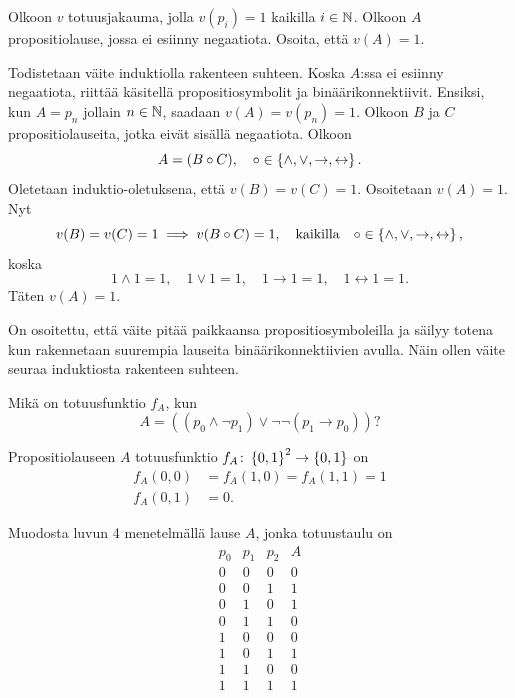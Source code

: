 \documentclass[12pt,a4paper]{article}
\begin{document}
\begin{exercise}
Olkoon \(v\) totuusjakauma, jolla \(v(p_i) = 1\) kaikilla \(i \in \mathbb{N}\).
Olkoon \(A\) propositiolause, jossa ei esiinny negaatiota. Osoita, että
\(v(A) = 1\).
\end{exercise}

\begin{solution}
Todistetaan väite induktiolla rakenteen suhteen. Koska \(A\):ssa ei
esiinny negaatiota, riittää käsitellä propositiosymbolit ja
binäärikonnektiivit. Ensiksi, kun \(A = p_n\)
jollain \(n \in \mathbb{N}\), saadaan \(v(A) = v(p_n) = 1\). Olkoon \(B\) ja \(C\)
propositiolauseita, jotka eivät sisällä negaatiota. Olkoon
\[
A = (B \circ C), \quad \circ \in \left\lbrace\land, \lor, \rightarrow,
\leftrightarrow\right\rbrace.
\]
Oletetaan induktio-oletuksena, että \(v(B) = v(C) = 1\).
Osoitetaan \(v(A) = 1\). Nyt
\[
v(B) = v(C) = 1 \implies v(B \circ C) = 1, \quad \text{kaikilla} \quad
\circ \in \left\lbrace\land, \lor, \rightarrow, \leftrightarrow\right\rbrace,
\]
koska
\[
1 \land 1 = 1, \quad 1 \lor 1 = 1, \quad 1 \rightarrow 1 = 1, \quad 1
\leftrightarrow 1 = 1.
\]
Täten \(v(A) = 1\).

On osoitettu, että väite pitää paikkaansa propositiosymboleilla ja
säilyy totena kun rakennetaan suurempia lauseita binäärikonnektiivien avulla.
Näin ollen väite seuraa induktiosta rakenteen suhteen.
\end{solution}

\begin{exercise}
Mikä on totuusfunktio \(f_A\), kun
\[
A = ((p_0 \land \neg p_1) \lor \neg \neg(p_1 \rightarrow p_0))?
\]
\end{exercise}

\begin{solution}
Propositiolauseen \(A\) totuusfunktio \(f_A \colon \left\lbrace0, 1\right\rbrace^2
\rightarrow \left\lbrace0, 1\right\rbrace\) on
\[
\begin{aligned}
f_A(0, 0) &= f_A(1, 0) = f_A(1, 1) = 1 \\
f_A(0, 1) &= 0.
\end{aligned}
\]
\end{solution}

\begin{exercise}
Muodosta luvun 4 menetelmällä lause \(A\), jonka totuustaulu on
\[
\begin{array}{ccc|c}
p_0 & p_1 & p_2 & A \\
\hline
0 & 0 & 0 & 0 \\
0 & 0 & 1 & 1 \\
0 & 1 & 0 & 1 \\
0 & 1 & 1 & 0 \\
1 & 0 & 0 & 0 \\
1 & 0 & 1 & 1 \\
1 & 1 & 0 & 0 \\
1 & 1 & 1 & 1
\end{array}
\]
\end{exercise}
\end{document}
